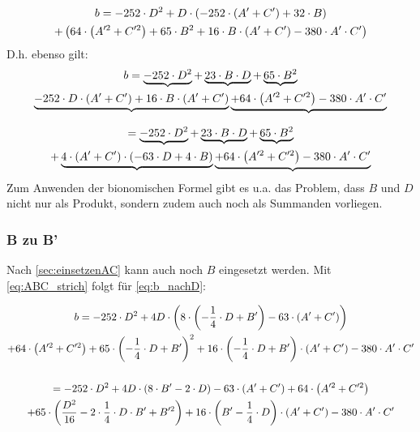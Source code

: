 \documentclass[12pt,a4paper]{article}
\begin{document}
\begin{gather} 
b = 
 -252\cdot D ^2 + D \cdot \left(
 -252\cdot \left( A' + C' \right) + 32 \cdot B 
  \right) \notag \\ \notag
 + \left( 
 64\cdot \left(A'^2 + C'^2\right) +65\cdot B^2 +
 16\cdot B\cdot \left(A' + C'\right) - 380 \cdot A' \cdot C' 
 \right) 
\end{gather}
D.h. ebenso gilt: 
\begin{gather} 
b = 
\underbrace{-252\cdot D^2 }
+ \underbrace{23 \cdot B \cdot D}
+ \underbrace{65\cdot B ^2} \\ \notag
\underbrace{
-252\cdot D \cdot \left( A' + C'\right) 
+ 16 \cdot B \cdot \left(A' + C'\right) 
}
\underbrace{
+ 64\cdot \left( A'^2 + C'^2\right) - 380 \cdot A' \cdot C'
}
\end{gather}

\begin{gather} 
= 
\underbrace{-252\cdot D^2 }
+ \underbrace{23 \cdot B \cdot D}
+ \underbrace{65\cdot B ^2} \\ \notag
+ \underbrace{
4  \cdot \left( A' + C'\right) \cdot \left( -63\cdot D + 4\cdot B\right)
}
\underbrace{
+ 64\cdot \left( A'^2 + C'^2\right) - 380 \cdot A' \cdot C'
}
\end{gather}
Zum Anwenden der bionomischen Formel gibt es u.a. das Problem, dass $B$ und $D$ nicht nur als Produkt, sondern zudem auch noch als Summanden vorliegen. 

\subsubsection{B zu B'}
Nach \ref{sec:einsetzenAC} kann auch noch $B$ eingesetzt werden. Mit \eqref{eq:ABC_strich} folgt für \eqref{eq:b_nachD}: 

\begin{gather}
 b = -252\cdot D ^2 + 4D \cdot \left(8 \cdot \left( - \frac{1}{4} \cdot D + B'\right)
 -63\cdot \left( A' + C' \right) 
  \right)  \label{eq:}\\ \notag
 + 
 64\cdot \left(A'^2 + C'^2\right) +65\cdot \left( - \frac{1}{4} \cdot D + B'\right)^2 +
 16\cdot \left( - \frac{1}{4} \cdot D + B'\right)\cdot \left(A' + C'\right) - 380 \cdot A' \cdot C' 
 \\ \notag \\ 
   = -252\cdot D^2 + 4D \cdot 
   \left(8 \cdot B' - 2\cdot D \right) 
 -63\cdot \left( A' + C' \right) +64\cdot \left(A'^2 + C'^2 \right)
 \\ \notag
  +
  65\cdot \left(
 \frac{D^2}{16} - 2 \cdot \frac{1}{4} \cdot D \cdot B' + B'^2  
  \right) +
 16\cdot \left( 
 B' - \frac{1}{4} \cdot D
 \right)
 \cdot \left(A' + C'\right) - 380 \cdot A' \cdot C' 
\end{gather} 
\end{document}
